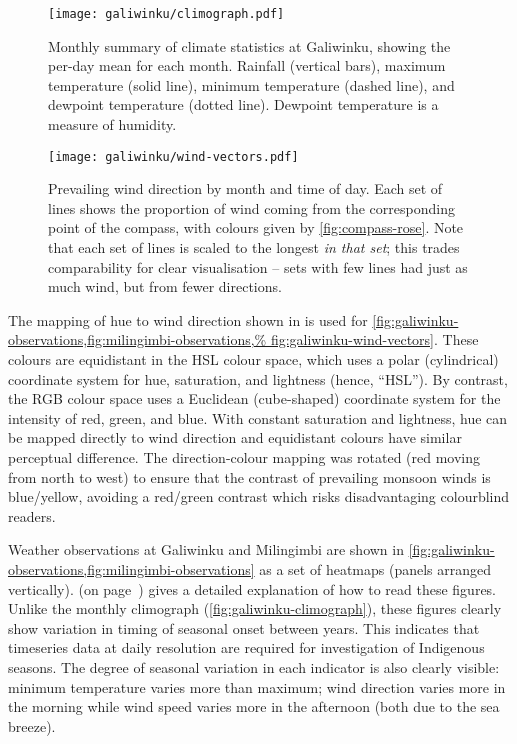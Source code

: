 \begin{figure}[p]
    \centering
    \texttt{[image: galiwinku/climograph.pdf]}
    \caption[Monthly Climograph for Galiwinku]{
        Monthly summary of climate statistics at Galiwinku, showing the per-day
        mean for each month.  Rainfall (vertical bars), maximum temperature
        (solid line), minimum temperature (dashed line), and  dewpoint
        temperature (dotted line).  Dewpoint temperature is a measure of humidity.}
    \label{fig:galiwinku-climograph}
\vspace{1cm}
    \centering
    \texttt{[image: galiwinku/wind-vectors.pdf]}
    \caption[Monthly wind vector summary for Galiwinku]{
        Prevailing wind direction by month and time of day.  Each set of
        lines shows the proportion of wind coming from the corresponding
        point of the compass, with colours given by \cref{fig:compass-rose}.
        Note that each set of lines is scaled to the longest \textit{in
        that set}; this trades comparability for clear visualisation --
        sets with few lines had just as much wind, but from fewer directions.
        }
    \label{fig:galiwinku-wind-vectors}
\end{figure}


The mapping of hue to wind direction shown in  is
used for \cref{fig:galiwinku-observations,fig:milingimbi-observations,%
fig:galiwinku-wind-vectors}.  These colours are equidistant in the HSL colour space,
which uses a polar (cylindrical) coordinate system for hue, saturation,
and lightness (hence, ``HSL'').  By contrast, the RGB colour space uses
a Euclidean (cube-shaped) coordinate system for the intensity of red,
green, and blue.  With constant saturation and lightness,
hue can be mapped directly to wind direction and equidistant colours
have similar perceptual difference.
%
The direction-colour mapping was rotated (red moving from north to west)
to ensure that the contrast of prevailing monsoon winds is blue/yellow,
avoiding a red/green contrast which risks disadvantaging colourblind readers.

Weather observations at Galiwinku and Milingimbi are shown in
\cref{fig:galiwinku-observations,fig:milingimbi-observations} as a set of
heatmaps (panels arranged vertically).  
(on page~\pageref{fig:how-read-multipanel}) gives a detailed explanation
of how to read these figures.
%
Unlike the monthly climograph (\cref{fig:galiwinku-climograph}), these
figures clearly show variation in timing of seasonal onset between years.
This indicates that timeseries data at daily resolution are required for
investigation of Indigenous seasons.
%
The degree of seasonal variation in each indicator is also clearly visible:
minimum temperature varies more than maximum; wind direction varies more in
the morning while wind speed varies more in the afternoon (both due to the
sea breeze).


